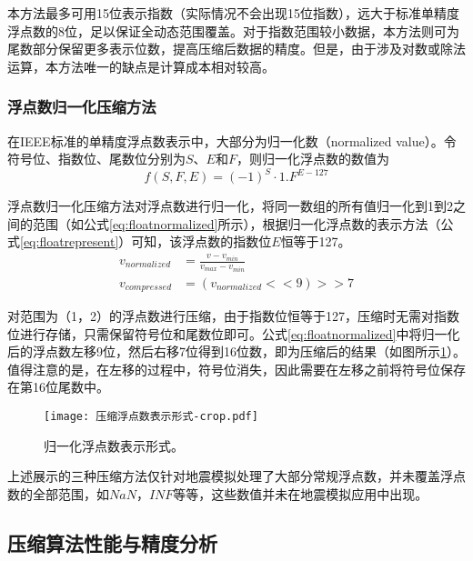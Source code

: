 本方法最多可用15位表示指数（实际情况不会出现15位指数），远大于标准单精度浮点数的8位，足以保证全动态范围覆盖。对于指数范围较小数据，本方法则可为尾数部分保留更多表示位数，提高压缩后数据的精度。但是，由于涉及对数或除法运算，本方法唯一的缺点是计算成本相对较高。

\subsubsection{浮点数归一化压缩方法}
在IEEE标准的单精度浮点数表示中，大部分为归一化数（normalized value）。令符号位、指数位、尾数位分别为$S$、$E$和$F$，则归一化浮点数的数值为
\begin{equation}
  f(S,F,E) = (-1)^S \cdot 1.F^{E-127}
\label{eq:floatrepresent}
\end{equation}

浮点数归一化压缩方法对浮点数进行归一化，将同一数组的所有值归一化到1到2之间的范围（如公式\ref{eq:floatnormalized}所示），根据归一化浮点数的表示方法（公式\ref{eq:floatrepresent}）可知，该浮点数的指数位$E$恒等于127。
\begin{equation}
\begin{aligned}
  v_{normalized} &= \frac{v - v_{min}}{v_{max} - v_{min}} \\
  v_{compressed} &= (v_{normalized} << 9) >> 7
\end{aligned}
\label{eq:floatnormalized}
\end{equation}

对范围为（1，2）的浮点数进行压缩，由于指数位恒等于127，压缩时无需对指数位进行存储，只需保留符号位和尾数位即可。公式\ref{eq:floatnormalized}中将归一化后的浮点数左移9位，然后右移7位得到16位数，即为压缩后的结果（如图所示\ref{fig:ieeefloatnormalized}）。值得注意的是，在左移的过程中，符号位消失，因此需要在左移之前将符号位保存在第16位尾数中。

\begin{figure}[ht]
\centering
\texttt{[image: 压缩浮点数表示形式-crop.pdf]}
\caption{归一化浮点数表示形式。}
\label{fig:ieeefloatnormalized}
\end{figure}

上述展示的三种压缩方法仅针对地震模拟处理了大部分常规浮点数，并未覆盖浮点数的全部范围，如$NaN$，$INF$等等，这些数值并未在地震模拟应用中出现。

\subsection{压缩算法性能与精度分析}

